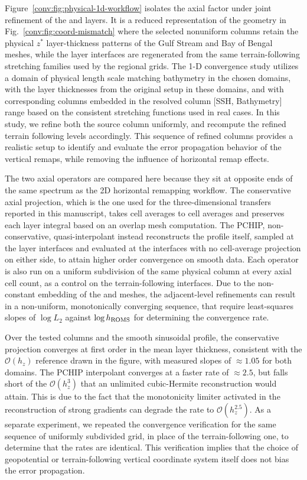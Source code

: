 Figure~\ref{conv:fig:physical-1d-workflow} isolates the axial factor under joint refinement of the \MPAS and \ROMS layers. It is a reduced representation of the geometry in Fig.~\ref{conv:fig:coord-mismatch} where the selected nonuniform \MPAS columns retain the physical $z^*$ layer-thickness patterns of the Gulf Stream and Bay of Bengal \MPAS meshes, while the \ROMS layer interfaces are regenerated from the same terrain-following stretching families used by the regional grids. The 1-D convergence study utilizes a domain of physical length scale matching bathymetry in the chosen domains, with the layer thicknesses from the original \MPAS setup in these domains, and with corresponding \ROMS columns embedded in the resolved \MPAS column [SSH, Bathymetry] range based on the consistent stretching functions used in real cases. In this study, we refine both the source \MPAS column uniformly, and recompute the refined \ROMS terrain following levels accordingly. This sequence of refined columns provides a realistic setup to identify and evaluate the error propagation behavior of the vertical remaps, while removing the influence of horizontal remap effects.

The two axial operators are compared here because they sit at opposite ends of the same spectrum as the 2D horizontal remapping workflow. The conservative axial projection, which is the one used for the three-dimensional transfers reported in this manuscript, takes \MPAS cell averages to \ROMS cell averages and preserves each \ROMS layer integral based on an overlap mesh computation. The PCHIP, non-conservative, quasi-interpolant instead reconstructs the profile itself, sampled at the \MPAS layer interfaces and evaluated at the \ROMS interfaces with no cell-average projection on either side, to attain higher order convergence on smooth data. Each operator is also run on a uniform subdivision of the same physical column at every axial cell count, as a control on the terrain-following interfaces. Due to the non-constant embedding of the \MPAS and \ROMS meshes, the adjacent-level refinements can result in a non-uniform, monotonically converging sequence, that require least-squares slopes of $\log L_2$ against $\log h_{\mathrm{ROMS}}$ for determining the convergence rate.

Over the tested columns and the smooth sinusoidal profile, the conservative projection converges at first order in the mean layer thickness, consistent with the $\mathcal{O}(h_z)$ reference drawn in the figure, with measured slopes of $\approx 1.05$ for both domains. The PCHIP interpolant converges at a faster rate of $\approx 2.5$, but falls short of the $\mathcal{O}(h_z^{3})$ that an unlimited cubic-Hermite reconstruction would attain. This is due to the fact that the monotonicity limiter activated in the reconstruction of strong gradients can degrade the rate to $\mathcal{O}(h_z^{2.5})$. As a separate experiment, we repeated the convergence verification for the same sequence of uniformly subdivided \ROMS grid, in place of the terrain-following one, to determine that the rates are identical. This verification implies that the choice of geopotential or terrain-following vertical coordinate system itself does not bias the error propagation.

